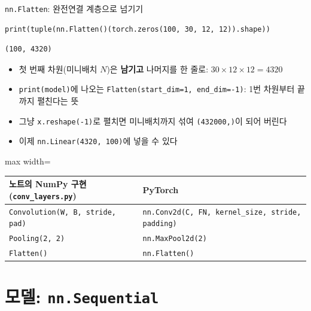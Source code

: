 \documentclass[aspectratio=169,11pt]{beamer}
\newcommand{\code}[1]{\texttt{#1}}
\begin{document}
\begin{frame}[fragile]{\code{nn.Flatten}: 완전연결 계층으로 넘기기}
\begin{lstlisting}
print(tuple(nn.Flatten()(torch.zeros(100, 30, 12, 12)).shape))
\end{lstlisting}
\begin{lstlisting}[style=outstyle]
(100, 4320)
\end{lstlisting}
\begin{itemize}
\item 첫 번째 차원(미니배치 $N$)은 \textbf{남기고} 나머지를 한 줄로: $30\times12\times12=4320$
\item \code{print(model)}에 나오는 \code{Flatten(start\_dim=1, end\_dim=-1)}: 1번 차원부터 끝까지 펼친다는 뜻
\item 그냥 \code{x.reshape(-1)}로 펼치면 미니배치까지 섞여 \code{(432000,)}이 되어 버린다
\item 이제 \code{nn.Linear(4320, 100)}에 넣을 수 있다
\end{itemize}
\vskip1mm
\begin{remarkbox}[세 계층의 대응]
\small
\centering
\begin{adjustbox}{max width=\linewidth}
\begin{tabular}{ll}
노트의 NumPy 구현 (\code{conv\_layers.py}) & PyTorch \\
\midrule
\code{Convolution(W, B, stride, pad)} & \code{nn.Conv2d(C, FN, kernel\_size, stride, padding)} \\
\code{Pooling(2, 2)} & \code{nn.MaxPool2d(2)} \\
\code{Flatten()} & \code{nn.Flatten()} \\
\end{tabular}
\end{adjustbox}
\end{remarkbox}
\end{frame}

\section{모델: \texttt{nn.Sequential}}
\end{document}
